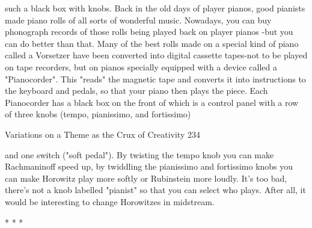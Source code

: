 such a black box with knobs. Back in the old days of player pianos, good pianists
made piano rolls of all sorts of wonderful music. Nowadays, you can buy phonograph
records of those rolls being played back on player pianos -but you can do better than
that. Many of the best rolls made on a special kind of piano called a Vorsetzer have
been converted into digital cassette tapes-not to be played on tape recorders, but on
pianos specially equipped with a device called a "Pianocorder". This "reads" the
magnetic tape and converts it into instructions to the keyboard and pedals, so that
your piano then plays the piece. Each Pianocorder has a black box on the front of
which is a control panel with a row of three knobs (tempo, pianissimo, and fortissimo)




Variations on a Theme as the Crux of Creativity                                      234

and one switch ("soft pedal"). By twisting the tempo knob you can make
Rachmaninoff speed up, by twiddling the pianissimo and fortissimo knobs you can
make Horowitz play more softly or Rubinstein more loudly. It's too bad, there's not a
knob labelled "pianist" so that you can select who plays. After all, it would be
interesting to change Horowitzes in midstream.

                                   *       *      *

